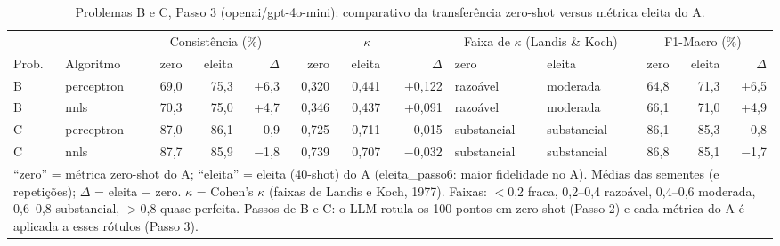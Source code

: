 \begin{table}[htbp]
\centering
\footnotesize
\caption{Problemas B e C, Passo 3 (openai/gpt-4o-mini): comparativo da transferência zero-shot versus métrica eleita do A.}
\label{tab:BC_passo3_zero_vs_eleita_gpt4mini}
\begin{tabular}{llrrrrrrllrrr}
\toprule
 &  & \multicolumn{3}{c}{Consistência (\%)} & \multicolumn{3}{c}{$\kappa$} & \multicolumn{2}{c}{Faixa de $\kappa$ (Landis \& Koch)} & \multicolumn{3}{c}{F1-Macro (\%)} \\ \cmidrule(lr){3-5} \cmidrule(lr){6-8} \cmidrule(lr){9-10} \cmidrule(lr){11-13}
Prob. & Algoritmo & zero & eleita & $\Delta$ & zero & eleita & $\Delta$ & zero & eleita & zero & eleita & $\Delta$ \\
\midrule
B & perceptron & 69,0 & 75,3 & +6,3 & 0,320 & 0,441 & +0,122 & razoável & moderada & 64,8 & 71,3 & +6,5 \\
B & nnls & 70,3 & 75,0 & +4,7 & 0,346 & 0,437 & +0,091 & razoável & moderada & 66,1 & 71,0 & +4,9 \\
\midrule
C & perceptron & 87,0 & 86,1 & $-$0,9 & 0,725 & 0,711 & $-$0,015 & substancial & substancial & 86,1 & 85,3 & $-$0,8 \\
C & nnls & 87,7 & 85,9 & $-$1,8 & 0,739 & 0,707 & $-$0,032 & substancial & substancial & 86,8 & 85,1 & $-$1,7 \\
\bottomrule
\multicolumn{13}{p{0.95\linewidth}}{\footnotesize ``zero'' = métrica zero-shot do A; ``eleita'' = eleita (40-shot) do A (eleita\_passo6: maior fidelidade no A). Médias das sementes (e repetições); $\Delta$ = eleita $-$ zero. $\kappa$ = Cohen's $\kappa$ (faixas de Landis e Koch, 1977). Faixas: $<$0,2 fraca, 0,2–0,4 razoável, 0,4–0,6 moderada, 0,6–0,8 substancial, $>$0,8 quase perfeita. Passos de B e C: o LLM rotula os 100 pontos em zero-shot (Passo 2) e cada métrica do A é aplicada a esses rótulos (Passo 3).} \\
\end{tabular}
\end{table}
